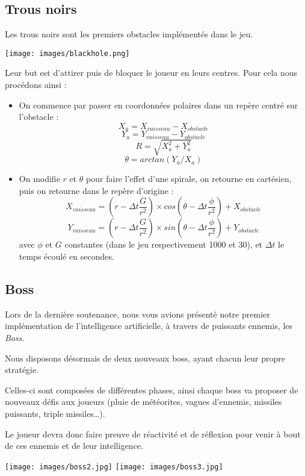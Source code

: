 \documentclass[12pt,a4paper]{article}
\begin{document}
\subsection{Trous noirs}
\par Les trous noirs sont les premiers obstacles implémentés dans le jeu.
\begin{center}
	\texttt{[image: images/blackhole.png]}
\end{center}
\par Leur but est d'attirer puis de bloquer le joueur en leurs centres. Pour cela nous procédons ainsi :
\begin{itemize}
\item On commence par passer en coordonnées polaires dans un repère centré sur l'obstacle :
$$ X_a = X_{vaisseau} - X_{obstacle} $$
$$ Y_a = Y_{vaisseau} - Y_{obstacle} $$
$$ R = \sqrt{X_a^2 + Y_a^2} $$
$$ \theta = arctan(Y_a / X_a) $$

\item On modifie $r$ et $\theta$ pour faire l'effet d'une spirale, on retourne en cartésien, puis on retourne dans le repère d'origine :
$$X_{vaisseau} = (r - \Delta t \frac{G}{r^2}) \times cos(\theta - \Delta t \frac{\phi}{r^2}) + X_{obstacle}$$
$$Y_{vaisseau} = (r - \Delta t \frac{G}{r^2}) \times sin(\theta - \Delta t \frac{\phi}{r^2}) + Y_{obstacle}$$
avec $\phi$ et $G$ constantes (dans le jeu respectivement 1000 et 30), et $\Delta t$ le temps écoulé en secondes.
\end{itemize}

\subsection{Boss}

\par Lors de la dernière soutenance, nous vous avions présenté notre premier implémentation de l'intelligence artificielle, à travers de puissants ennemis, les \emph{Boss}.
\par Nous disposons désormais de deux nouveaux boss, ayant chacun leur propre stratégie.

Celles-ci sont composées de différentes phases, ainsi chaque boss va proposer de nouveaux défis aux joueurs (pluie de météorites, vagues d'ennemis, missiles puissants, triple missiles\ldots).

Le joueur devra donc faire preuve de réactivité et de réflexion pour venir à bout de ces ennemis et de leur intelligence.

\begin{center}
\texttt{[image: images/boss2.jpg]}
\texttt{[image: images/boss3.jpg]}
\end{center}
\end{document}
